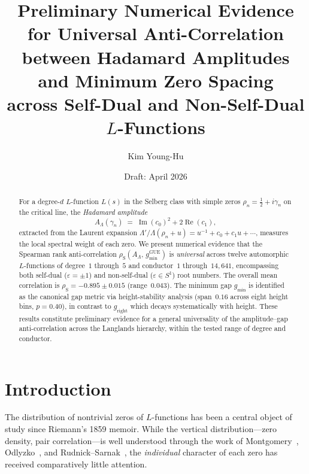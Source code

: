 \documentclass[11pt, a4paper]{article}
\title{%
  Preliminary Numerical Evidence for Universal Anti-Correlation \\
  between Hadamard Amplitudes and Minimum Zero Spacing \\
  across Self-Dual and Non-Self-Dual $L$-Functions%
}
\author{Kim Young-Hu}
\date{Draft: April 2026}
\theoremstyle{plain}
\theoremstyle{definition}
\newcommand{\Lam}{\Lambda}
\DeclareMathOperator{\GUE}{GUE}
\begin{document}
\maketitle

\begin{abstract}
For a degree-$d$ $L$-function $L(s)$ in the Selberg class with
simple zeros $\rho_n = \tfrac{1}{2} + i\gamma_n$ on the critical
line, the \emph{Hadamard amplitude}
\[
  A_\Lam(\gamma_n)
  \;=\; \operatorname{Im}(c_0)^2 + 2\operatorname{Re}(c_1),
\]
extracted from the Laurent expansion
$\Lam'/\Lam(\rho_n + u) = u^{-1} + c_0 + c_1 u + \cdots$,
measures the local spectral weight of each zero.
We present numerical evidence that the Spearman rank
anti-correlation $\rho_{\mathrm{S}}(A_\Lam,\, g_{\min}^{\GUE})$
is \emph{universal} across twelve automorphic $L$-functions of
degree~$1$ through~$5$ and conductor~$1$ through~$14{,}641$,
encompassing both self-dual ($\varepsilon = \pm 1$) and
non-self-dual ($\varepsilon \in S^1$) root numbers.
The overall mean correlation is
$\rho_{\mathrm{S}} = -0.895 \pm 0.015$ (range~$0.043$).
The minimum gap $g_{\min}$ is identified as the canonical gap
metric via height-stability analysis (span~$0.16$ across eight
height bins, $p = 0.40$), in contrast to $g_{\mathrm{right}}$
which decays systematically with height.
These results constitute preliminary evidence for a
general universality of the amplitude--gap anti-correlation
across the Langlands hierarchy, within the tested range of
degree and conductor.
\end{abstract}


\section{Introduction}
\label{sec:intro}

The distribution of nontrivial zeros of $L$-functions has been a
central object of study since Riemann's 1859 memoir.  While the
vertical distribution---zero density, pair correlation---is well
understood through the work of
Montgomery~\cite{montgomery1973}, Odlyzko~\cite{odlyzko1987},
and Rudnick--Sarnak~\cite{rudnick1996}, the \emph{individual}
character of each zero has received comparatively little attention.
\end{document}
